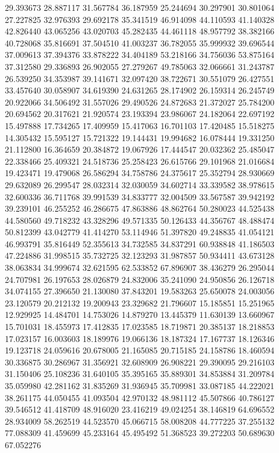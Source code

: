 29.393673
28.887117
31.567784
36.187959
25.244694
30.297901
30.801064
27.227825
32.976393
29.692178
35.341519
46.914098
44.110593
41.140328
42.826440
43.065256
43.020703
45.282435
44.461118
48.957792
38.382166
40.728068
35.816691
37.504510
41.003237
36.782055
35.999932
39.696544
37.009613
37.394376
33.878222
34.404189
53.218166
34.756036
53.875164
37.312580
29.336893
26.902055
27.279267
49.785063
32.066661
31.243787
26.539250
34.353987
39.141671
32.097420
38.722671
30.551079
26.427551
33.457640
30.058907
34.619390
24.631265
28.174902
26.159314
26.245749
20.922066
34.506492
31.557026
29.490526
24.872683
21.372027
25.784200
20.694562
20.317621
21.920574
23.193394
23.986067
24.182064
22.697192
15.497888
17.734265
17.409959
15.417063
16.701103
17.420485
15.518275
14.305432
15.595127
15.721322
19.144431
19.994682
16.078444
19.331250
21.112800
16.364659
20.384872
19.067926
17.444547
20.032362
25.485047
22.338466
25.409321
24.518736
25.258423
26.615766
29.101968
21.016684
19.423471
19.479068
26.586294
34.758786
24.375617
25.352794
28.930669
29.632089
26.299547
28.032314
32.030059
34.602714
33.339582
38.978615
32.600336
36.711768
39.991539
34.833777
32.004509
33.567587
39.942192
39.239101
46.255252
46.286675
47.863886
48.862764
50.280023
44.525438
44.580560
49.718232
43.328296
49.571335
50.126433
44.356767
48.488474
50.812399
43.042779
41.414270
53.114946
51.397820
49.248835
41.054121
46.993791
35.816449
52.355613
34.732585
34.837291
60.938848
41.186503
47.224886
31.998515
35.732725
32.123293
31.987857
50.934411
43.673128
38.063834
34.999674
32.621595
62.533852
67.896907
38.436279
26.295044
24.707981
26.197653
28.026879
24.832006
35.241090
24.950856
26.126718
34.074155
27.396650
21.130080
37.843201
19.583263
25.650078
24.003056
23.120579
20.212132
19.200943
23.329682
21.796607
15.185851
15.251965
12.929925
14.484701
14.753026
14.879270
13.445379
11.630139
13.660967
15.701031
18.455973
17.412835
17.023585
18.719871
20.385137
18.218853
17.023157
16.003603
18.189976
19.066136
18.187324
17.167737
18.126346
19.123718
24.059616
20.678005
21.165085
20.715185
24.158786
18.460594
30.336875
30.286967
31.356921
32.608909
26.908221
29.390095
29.216103
31.150406
25.108236
31.640105
35.395165
35.889301
34.853884
31.209784
35.059980
42.281162
31.835269
31.936945
35.709981
33.087185
44.222021
38.261175
44.050455
41.093504
42.970132
48.981112
45.507866
40.786127
39.546512
41.418709
48.916020
23.416219
49.024254
38.146819
64.696552
28.934009
58.262519
44.523570
45.066715
58.008208
44.777225
37.255132
77.088309
41.459699
45.233164
45.495492
51.368523
39.272203
50.689630
67.052276
